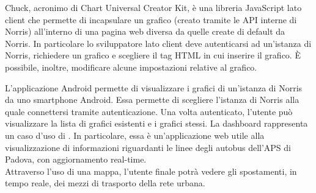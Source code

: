         Chuck, acronimo di Chart Universal Creator Kit, è una libreria JavaScript lato client che permette di incapsulare un grafico (creato tramite le API interne di Norris) all'interno di una pagina web diversa da quelle create di default da Norris. In particolare lo sviluppatore lato client deve autenticarsi ad un'istanza di Norris, richiedere un grafico e scegliere il tag HTML in cui inserire il grafico. È possibile, inoltre, modificare alcune impostazioni relative al grafico.
    
        L'applicazione Android permette di visualizzare i grafici di un'istanza di Norris da uno smartphone Android. Essa permette di scegliere l'istanza di Norris alla quale connettersi tramite autenticazione. Una volta autenticato, l'utente può visualizzare la lista di grafici esistenti e i grafici stessi.
        La dashboard rappresenta un caso d'uso di \projectname{}. In particolare, essa è un'applicazione web utile alla visualizzazione di informazioni riguardanti le linee degli autobus dell'APS di Padova, con aggiornamento real-time.\\
        Attraverso l'uso di una mappa, l'utente finale potrà vedere gli spostamenti, in tempo reale, dei mezzi di trasporto della rete urbana.\\
    
